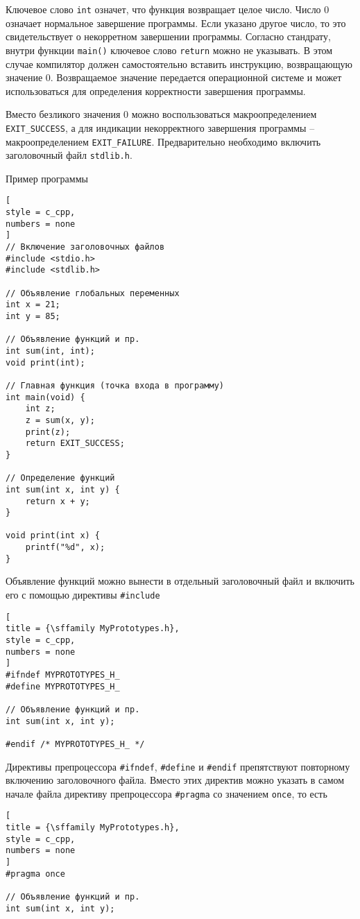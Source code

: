 \documentclass[%
	11pt,
	a4paper,
	utf8,
		]{article}
\begin{document}
Ключевое слово \verb|int| означет, что функция возвращает целое число. Число 0 означает нормальное завершение программы. Если указано другое число, то это свидетельствует о некорретном завершении программы. Согласно стандрату, внутри функции \verb|main()| ключевое слово \verb|return| можно не указывать. В этом случае компилятор должен самостоятельно вставить инструкцию, возвращающую значение 0. Возвращаемое значение передается операционной системе и может использоваться для определения корректности завершения программы.

Вместо безликого значения 0 можно воспользоваться макроопределением \verb|EXIT_SUCCESS|, а для индикации некорректного завершения программы -- макроопределением \verb|EXIT_FAILURE|. Предварительно необходимо включить заголовочный файл \verb|stdlib.h|.

Пример программы
\begin{lstlisting}[
style = c_cpp,
numbers = none
]
// Включение заголовочных файлов
#include <stdio.h>
#include <stdlib.h>

// Объявление глобальных переменных
int x = 21;
int y = 85;

// Объявление функций и пр.
int sum(int, int);
void print(int);

// Главная функция (точка входа в программу)
int main(void) {
    int z;
    z = sum(x, y);
    print(z);
    return EXIT_SUCCESS;
}

// Определение функций
int sum(int x, int y) {
    return x + y;
}

void print(int x) {
    printf("%d", x);
}
\end{lstlisting}

Объявление функций можно вынести в отдельный заголовочный файл и включить его с помощью директивы \verb|#include|
\begin{lstlisting}[
title = {\sffamily MyPrototypes.h},
style = c_cpp,
numbers = none
]
#ifndef MYPROTOTYPES_H_
#define MYPROTOTYPES_H_

// Объявление функций и пр.
int sum(int x, int y);

#endif /* MYPROTOTYPES_H_ */
\end{lstlisting}

Директивы препроцессора \verb|#ifndef|, \verb|#define| и \verb|#endif| препятствуют повторному включению заголовочного файла. Вместо этих директив можно указать в самом начале файла директиву препроцессора \verb|#pragma| со значением \verb|once|, то есть
\begin{lstlisting}[
title = {\sffamily MyPrototypes.h},
style = c_cpp,
numbers = none
]
#pragma once

// Объявление функций и пр.
int sum(int x, int y);
\end{lstlisting}
\end{document}
